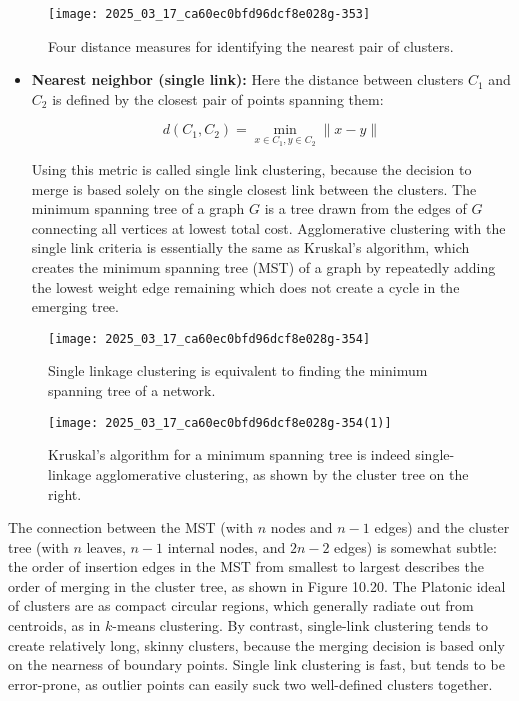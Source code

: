 \documentclass[10pt]{article}
\begin{document}
\begin{figure}[H]
    \centering
    \texttt{[image: 2025\_03\_17\_ca60ec0bfd96dcf8e028g-353]}
    \caption{Four distance measures for identifying the nearest pair of clusters.}
    \label{fig:four_distance_measures}
\end{figure}

\begin{itemize}
  \item \textbf{Nearest neighbor (single link):} Here the distance between clusters $C_{1}$ and $C_{2}$ is defined by the closest pair of points spanning them:

  \[
  d\left(C_{1}, C_{2}\right)=\min _{x \in C_{1}, y \in C_{2}}\|x-y\|
  \]

  Using this metric is called single link clustering, because the decision to merge is based solely on the single closest link between the clusters.
  The minimum spanning tree of a graph $G$ is a tree drawn from the edges of $G$ connecting all vertices at lowest total cost. Agglomerative clustering with the single link criteria is essentially the same as Kruskal's algorithm, which creates the minimum spanning tree (MST) of a graph by repeatedly adding the lowest weight edge remaining which does not create a cycle in the emerging tree.
\end{itemize}

\begin{figure}[H]
    \centering
    \texttt{[image: 2025\_03\_17\_ca60ec0bfd96dcf8e028g-354]}
    \caption{Single linkage clustering is equivalent to finding the minimum spanning tree of a network.}
\end{figure}

\begin{figure}[H]
    \centering
    \texttt{[image: 2025\_03\_17\_ca60ec0bfd96dcf8e028g-354(1)]}
    \caption{Kruskal's algorithm for a minimum spanning tree is indeed single-linkage agglomerative clustering, as shown by the cluster tree on the right.}
\end{figure}

The connection between the MST (with $n$ nodes and $n-1$ edges) and the cluster tree (with $n$ leaves, $n-1$ internal nodes, and $2n-2$ edges) is somewhat subtle: the order of insertion edges in the MST from smallest to largest describes the order of merging in the cluster tree, as shown in Figure 10.20. The Platonic ideal of clusters are as compact circular regions, which generally radiate out from centroids, as in $k$-means clustering. By contrast, single-link clustering tends to create relatively long, skinny clusters, because the merging decision is based only on the nearness of boundary points. Single link clustering is fast, but tends to be error-prone, as outlier points can easily suck two well-defined clusters together.
\end{document}
